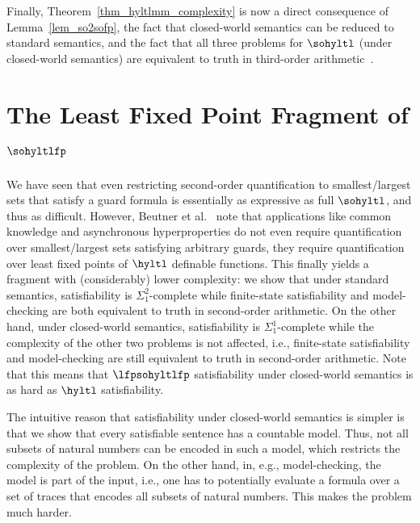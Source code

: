 Finally, Theorem~\ref{thm_hyltlmm_complexity} is now a direct consequence of Lemma~\ref{lem_so2sofp}, the fact that closed-world semantics can be reduced to standard semantics, and the fact that all three problems for $\sohyltl$ (under closed-world semantics) are equivalent to truth in third-order arithmetic~\cite{sohypercomplexity}.


\section{\texorpdfstring{The Least Fixed Point Fragment of $\sohyltlfp$}{Second-order HyperLTL with Least Fixed Points}}
\label{sec_lfp}

We have seen that even restricting second-order quantification to smallest/largest sets that satisfy a guard formula is essentially as expressive as full $\sohyltl$, and thus as difficult.
However, Beutner et al.~\cite{DBLP:conf/cav/BeutnerFFM23} note that applications like common knowledge and asynchronous hyperproperties do not even require quantification over smallest/largest sets satisfying arbitrary guards, they  require quantification over least fixed points of $\hyltl$ definable functions.
This finally yields a fragment with (considerably) lower complexity: 
we show that under standard semantics, satisfiability is $\Sigma_1^2$-complete while finite-state satisfiability and model-checking are both equivalent to truth in second-order arithmetic.
On the other hand, under closed-world semantics, satisfiability is $\Sigma_1^1$-complete while the complexity of the other two problems is not affected, i.e., finite-state satisfiability and model-checking are still equivalent to truth in second-order arithmetic.
Note that this means that $\lfpsohyltlfp$ satisfiability under closed-world semantics is as hard as  $\hyltl$ satisfiability.

The intuitive reason that satisfiability under closed-world semantics is simpler is that we show that every satisfiable sentence has a countable model. 
Thus, not all subsets of natural numbers can be encoded in such a model, which restricts the complexity of the problem.
On the other hand, in, e.g., model-checking, the model is part of the input, i.e., one has to potentially evaluate a formula over a set of traces that encodes all subsets of natural numbers. 
This makes the problem much harder. 

